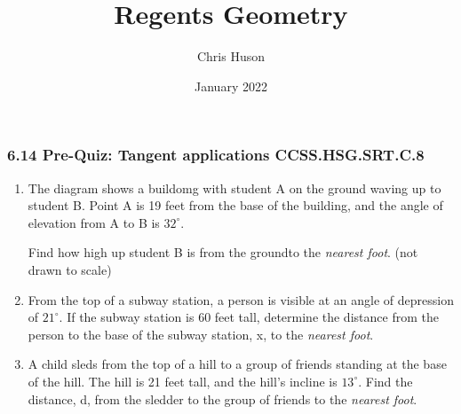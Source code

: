 \documentclass[12pt, twoside]{article}
\title{Regents Geometry}
\author{Chris Huson}
\date{January 2022}
\begin{document}
\subsubsection*{6.14 Pre-Quiz: Tangent applications \hfill CCSS.HSG.SRT.C.8}

\begin{enumerate}
\item The diagram shows a buildomg with student A on the ground waving up to student B. Point A is 19 feet from the base of the building, and the angle of elevation from A to B is $32^\circ$.
 
Find how high up student B is from the groundto the \emph{nearest foot}. \hfill (not drawn to scale)
  \begin{flushright}
    \end{flushright}

\item From the top of a subway station, a person is visible at an angle of depression of $21^\circ$. If the subway station is 60 feet tall, determine the distance from the person to the base of the subway station, x, to the \emph{nearest foot}.
\begin{center}
  \end{center} \vspace{2cm}

\item A child sleds from the top of a hill to a group of friends standing at the base of the hill. The hill is 21 feet tall, and the hill's incline is $13^\circ$. Find the distance, d, from the sledder to the group of friends to the \emph{nearest foot}.


\end{enumerate}
\end{document}

